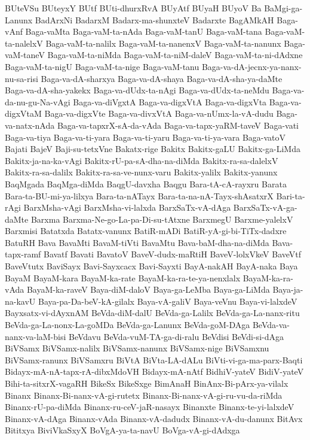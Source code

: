{BUteVSu
BUteyxY
BUtf
BUti-dhurxRvA
BUyAtf
BUyaH
BUyoV
Ba
BaMgi-ga-Lanunx
BadArxNi
BadarxM
Badarx-ma-shunxteV
Badarxte
BagAMkAH
Baga-vAnf
Baga-vaMta
Baga-vaM-ta-nAda
Baga-vaM-tanU
Baga-vaM-tana
Baga-vaM-ta-nalelxV
Baga-vaM-ta-nalilx
Baga-vaM-ta-nanenxV
Baga-vaM-ta-nanunx
Baga-vaM-taneV
Baga-vaM-ta-niMda
Baga-vaM-ta-niM-daleV
Baga-vaM-ta-ni-dAdxne
Baga-vaM-ta-nigU
Baga-vaM-ta-nige
Baga-vaM-tanu
Baga-va-dA-jecnx-ya-nanx-nu-sa-risi
Baga-va-dA-sharxya
Baga-va-dA-shaya
Baga-va-dA-sha-ya-daMte
Baga-va-dA-sha-yakekx
Baga-va-dUdx-ta-nAgi
Baga-va-dUdx-ta-neMdu
Baga-va-da-nu-gu-Na-vAgi
Baga-va-diVgxtA
Baga-va-digxVtA
Baga-va-digxVta
Baga-va-digxVtaM
Baga-va-digxVte
Baga-va-divxVtA
Baga-va-nUmx-la-vA-dudu
Baga-va-natx-nAda
Baga-va-tapxrX-sA-da-vAda
Baga-va-tapx-yaRM-taveV
Baga-vati
Baga-va-tiya
Baga-va-ti-yara
Baga-va-ti-yaru
Baga-va-ti-ya-vara
Baga-vatoV
Bajati
BajeV
Baji-su-tetxVne
Bakatx-rige
Bakitx
Bakitx-gaLU
Bakitx-ga-LiMda
Bakitx-ja-na-ka-vAgi
Bakitx-rU-pa-sA-dha-na-diMda
Bakitx-ra-sa-dalelxV
Bakitx-ra-sa-dalilx
Bakitx-ra-sa-ve-nunx-varu
Bakitx-yalilx
Bakitx-yanunx
BaqMgada
BaqMga-diMda
BaqgU-davxha
Baqgu
Bara-tA-cA-rayxru
Barata
Bara-ta-BU-mi-ya-lilxya
Bara-ta-nATayx
Bara-ta-na-nA-Tayx-shAsatxrX
Bari-ta-rAgi
BarxMsha-vAgi
BarxMsha-vi-lalxda
BarxSaTx-vA-dAga
BarxSaTx-vA-ga-daMte
Barxma
Barxma-Ne-go-La-pa-Di-su-tAtxne
BarxmegU
Barxme-yalelxV
Barxmisi
Batatxda
Batatx-vanunx
BatiR-mADi
BatiR-yA-gi-bi-TiTx-dadxre
BatuRH
Bava
BavaMti
BavaM-tiVti
BavaMtu
Bava-baM-dha-na-diMda
Bava-tapx-ramf
Bavatf
Bavati
BavatoV
BaveV-dudx-maRtiH
BaveV-lolxVkeV
BaveVtf
BaveVtutx
BaviSayx
Bavi-Sayxcacx
Bavi-Sayxti
BayA-nakAH
BayA-naka
Baya
BayaM
BayaM-kara
BayaM-ka-rate
BayaM-ka-ra-te-ya-nenxlalx
BayaM-ka-ra-vAda
BayaM-ka-raveV
Baya-diM-daloV
Baya-ga-LeMba
Baya-ga-LiMda
Baya-ja-na-kavU
Baya-pa-Da-beV-kA-gilalx
Baya-vA-galiV
Baya-veVnu
Baya-vi-lalxdeV
Bayxsatx-vi-dAyxnAM
BeVda-diM-dalU
BeVda-ga-Lalilx
BeVda-ga-La-nanx-ritu
BeVda-ga-La-nonx-La-goMDa
BeVda-ga-Lanunx
BeVda-goM-DAga
BeVda-va-nanx-va-laM-bisi
BeVdavu
BeVda-vuM-TA-ga-di-ralu
BeVdisi
BeVdi-si-dAga
BiVSamx
BiVSamx-nalilx
BiVSamx-nanunx
BiVSamx-nige
BiVSamxnu
BiVSamx-ranunx
BiVSamxru
BiVtA
BiVta-LA-dALu
BiVti-vi-ga-ma-parx-Baqti
Bidayx-mA-nA-tapx-rA-dibxMdoVH
Bidayx-mA-nAtf
BidhiV-yateV
BidiV-yateV
Bihi-ta-sitxrX-vagaRH
BikeSx
BikeSxge
BimAnaH
BinAnx-Bi-pArx-ya-vilalx
Binanx
Binanx-Bi-nanx-vA-gi-rutetx
Binanx-Bi-nanx-vA-gi-ru-vu-da-riMda
Binanx-rU-pa-diMda
Binanx-ru-ceV-jaR-nasayx
Binanxte
Binanx-te-yi-lalxdeV
Binanx-vA-dAga
Binanx-vAda
Binanx-vA-dadudx
Binanx-vA-du-danunx
BitAvx
Bititxya
BiviVkaSxyX
BoVgA-ya-ta-navU
BoVga-vA-gi-dAdxga
}
